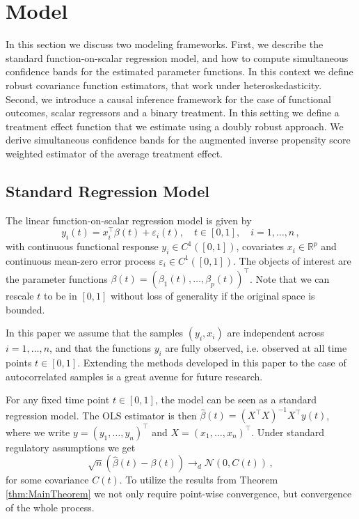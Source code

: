 \section{Model}

In this section we discuss two modeling frameworks. First, we describe the standard
function-on-scalar regression model, and how to compute simultaneous confidence bands
for the estimated parameter functions. In this context we define robust covariance
function estimators, that work under heteroskedasticity. Second, we introduce a causal
inference framework for the case of functional outcomes, scalar regressors and a binary
treatment. In this setting we define a treatment effect function that we estimate using
a doubly robust approach. We derive simultaneous confidence bands for the augmented
inverse propensity score weighted estimator of the average treatment effect.

\subsection{Standard Regression Model}

The linear function-on-scalar regression model is given by
\[
    y_i(t) = x_i^\top \beta(t) + \varepsilon_i(t), \quad t \in [0, 1], \quad i =
    1,\dots,n \,,
\]
with continuous functional response $y_i \in C^1([0, 1])$, covariates $x_i \in
\mathbb{R}^p$ and continuous mean-zero error process $\varepsilon_i \in C^1([0, 1])$.
The objects of interest are the parameter functions $\beta(t) = (\beta_1(t), \dots,
\beta_p(t))^\top$.  Note that we can rescale $t$ to be in $[0, 1]$ without loss of
generality if the original space is bounded.

In this paper we assume that the samples $(y_i, x_i)$ are independent across $i =
1,\dots, n$, and that the functions $y_i$ are fully observed, i.e.  observed at all time
points $t \in [0, 1]$. Extending the methods developed in this paper to the case of
autocorrelated samples is a great avenue for future research.

For any fixed time point $t \in [0, 1]$, the model can be seen as a standard regression
model. The OLS estimator is then $\hat{\beta}(t) = (X^\top X)^{-1}X^\top y(t)$, where we
write $y = (y_1, \dots, y_n)^\top$ and $X = (x_1, \dots, x_n)^\top$. Under standard
regulatory assumptions we get
\[
    \sqrt{n}(\hat{\beta}(t) - \beta(t)) \to_d \mathcal{N}(0, C(t)) \,,
\]
for some covariance $C(t)$. To utilize the results from Theorem \ref{thm:MainTheorem}
we not only require point-wise convergence, but convergence of the whole process.

